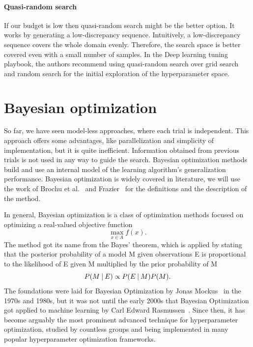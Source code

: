 \paragraph{Quasi-random search} If our budget is low then quasi-random search might be the better option. It works by generating a low-discrepancy sequence. Intuitively, a low-discrepancy sequence covers the whole domain evenly. Therefore, the search space is better covered even with a small number of samples. In the Deep learning tuning playbook, the authors recommend using quasi-random search over grid search and random search for the initial exploration of the hyperparameter space.



\section{Bayesian optimization}
So far, we have seen model-less approaches, where each trial is independent. This approach offers some advantages, like parallelization and simplicity of implementation, but it is quite inefficient. Information obtained from previous trials is not used in any way to guide the search. Bayesian optimization methods build and use an internal model of the learning algorithm's generalization performance. Bayesian optimization is widely covered in literature, we will use the work of Brochu et al.~\cite{brochu2010tutorial} and Frazier~\cite{frazier2018tutorial} for the definitions and the description of the method.

In general, Bayesian optimization is a class of optimization methods focused on optimizing a real-valued objective function \[ \max_{x\in A} f(x). \] The method got its name from the Bayes' theorem, which is applied by stating that the posterior probability of a model M given observations E is proportional to the likelihood of E given M multiplied by the prior probability of M \[ P(M \:\vert\: E) \propto P(E \:\vert\: M)P(M).\] The foundations were laid for Bayesian Optimization by Jonas Mockus~\cite{mockus1974bayesian} in the 1970s and 1980s, but it was not until the early 2000s that Bayesian Optimization got applied to machine learning by Carl Edward Rasmussen~\cite{rasmussen2006gaussian}. Since then, it has become arguably the most prominent advanced technique for hyperparameter optimization, studied by countless groups and being implemented in many popular hyperparameter optimization frameworks.

